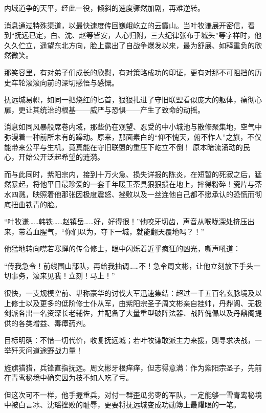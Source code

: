 \vspace{2em}

内域道争的天平，经此一役，倾斜的速度骤然加剧，再难逆转。

消息通过特殊渠道，以最快速度传回巍峨屹立的云霞山。当叶牧谦展开密信，看到“抚远已定，白、沈、赵等皆安，人心归附，三大纪律张布于城头”等字样时，他久久伫立，遥望东北方向，脸上露出了自战争爆发以来，最为舒展、如释重负的欣然微笑。

那笑容里，有对弟子们成长的欣慰，有对策略成功的印证，更有对那不可阻挡的历史车轮滚滚向前的深切感悟与感慨。

\vspace{2em}

抚远城易帜，如同一把烧红的匕首，狠狠扎进了守旧联盟看似庞大的躯体，痛彻心扉，更让其统治的根基——威严与恐惧——产生了致命的动摇。

消息如同风暴般席卷内域，那些仍在观望、忍受的中小城池与散修聚集地，空气中弥漫着一种前所未有的躁动。原来，那面素白的“仰不愧天，俯不怍人”之旗，不仅能带来公平与生机，竟真能在守旧联盟的重压下屹立不倒！ 原本暗流涌动的民心，开始公开泛起希望的涟漪。

而与此同时，紫阳宗内，接到十万火急、损失详报的陈炎，在短暂的死寂之后，猛然暴起，将他平日最珍爱的一套千年暖玉茶具狠狠掼在地上，摔得粉碎！瓷片与茶水四溅，映照着他那张因极度震怒、挫败以及一丝连他自己都不愿承认的恐慌而彻底扭曲铁青的脸。

“叶牧谦……韩铁……赵镇岳……好，好得很！”他咬牙切齿，声音从喉咙深处挤压出来，带着血腥气，“你们以为，夺下一城，就能翻天覆地吗？！”

他猛地转向噤若寒蝉的传令修士，眼中闪烁着近乎疯狂的凶光，嘶声吼道：

“传我急令！前线围山部队，再给我抽调……不！急令周文彬，让他立刻放下手头一切事务，滚来见我！立刻！马上！”

\vspace{2em}

很快，一支规模空前、堪称豪华的讨伐大军迅速集结：超过一千五百名玄脉境及以上修士以及更多的低阶修士仆从军，由紫阳宗圣子周文彬亲自挂帅，丹鼎阁、无极剑派各出一名资深长老辅佐，并配备了大量重型破阵法器、战阵傀儡以及丹鼎阁提供的各类增益、毒瘴药剂。

目标明确：不惜一切代价，收复抚远城；若叶牧谦敢派主力来援，则寻求决战，一举歼灭问道途野战力量！

旌旗猎猎，兵锋直指抚远。周文彬牙根痒痒，但志得意满：作为紫阳宗圣子，先前在青鸾秘境中确实因为技不如人吃了亏。

但这次可不一样，他手握重兵，对付一群歪瓜劣枣的军队，一定能够一雪青鸾秘境中被白言冰、沈瑶挫败的耻辱，更要将抚远城变成功勋簿上最耀眼的一笔。

